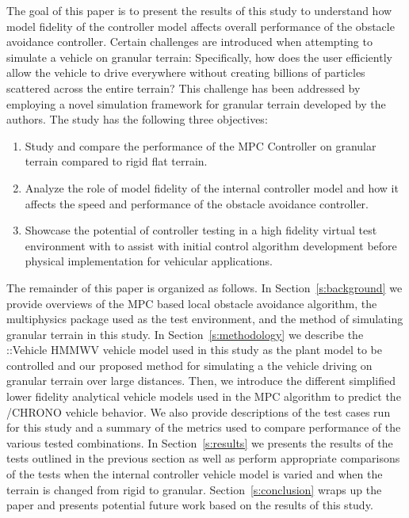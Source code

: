 \documentclass[12pt,twocolumn]{article}
\newcommand{\CHRONO}{{\sffamily{{Chrono}}}}
\newcommand{\ChronoVehicle}{{\sffamily{Chrono}}::Vehicle}
\begin{document}
The goal of this paper is to present the results of this study to understand how model fidelity of the controller model affects overall performance of the obstacle avoidance controller. Certain challenges are introduced when attempting to simulate a vehicle on granular terrain: Specifically, how does the user efficiently allow the vehicle to drive everywhere without creating billions of particles scattered across the entire terrain? This challenge has been addressed by employing a novel simulation framework for granular terrain developed by the authors. The study has the following three objectives:
\begin{enumerate}
\item
Study and compare the performance of the MPC Controller on granular terrain compared to rigid flat terrain.
\item
Analyze the role of model fidelity of the internal controller model and how it affects the speed and performance of the obstacle avoidance controller.
\item
Showcase the potential of controller testing in a high fidelity virtual test environment with {\CHRONO} to assist with initial control algorithm development before physical implementation for vehicular applications.
\end{enumerate}

The remainder of this paper is organized as follows.  In Section~\ref{s:background} we provide overviews of the MPC based local obstacle avoidance algorithm, the {\CHRONO} multiphysics package used as the test environment, and the method of simulating granular terrain in this study. In Section~\ref{s:methodology} we describe the {\ChronoVehicle} HMMWV vehicle model used in this study as the plant model to be controlled and our proposed method for simulating a the vehicle driving on granular terrain over large distances. Then, we introduce the different simplified lower fidelity analytical vehicle models used in the MPC algorithm to predict the /CHRONO vehicle behavior. We also provide descriptions of the test cases run for this study and a summary of the metrics used to compare performance of the various tested combinations. In Section~\ref{s:results} we presents the results of the tests outlined in the previous section as well as perform appropriate comparisons of the tests when the internal controller vehicle model is varied and when the terrain is changed from rigid to granular. Section~\ref{s:conclusion} wraps up the paper and presents potential future work based on the results of this study.
\end{document}
